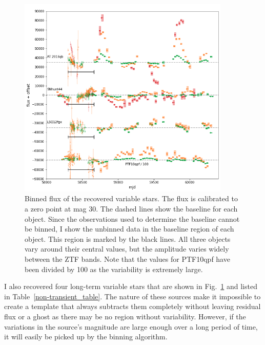 \documentclass[a4paper,oneside,12pt, class=Latex/Classes/PhDthesisPSnPDF, crop=false]{standalone}
\begin{document}
\begin{figure}[h!]
    \centering
    \includegraphics[width=0.9\textwidth]{../Images/chapter_4/non-transients_varstar.png}
    \caption{Binned flux of the recovered variable stars. The flux is calibrated to a zero point at mag 30. The dashed lines show the baseline for each object. Since the observations used to determine the baseline cannot be binned, I show the unbinned data in the baseline region of each object. This region is marked by the black lines. All three objects vary around their central values, but the amplitude varies widely between the ZTF bands. Note that the values for PTF10qpf have been divided by 100 as the variability is extremely large.}
    \label{non-transients_varstar}
\end{figure}

I also recovered four long-term variable stars that are shown in Fig.~\ref{non-transients_varstar} and listed in Table~\ref{non-transient_table}. The nature of these sources make it impossible to create a template that always subtracts them completely without leaving residual flux or a ghost as there may be no region without variability. However, if the variations in the source's magnitude are large enough over a long period of time, it will easily be picked up by the binning algorithm.
\end{document}
